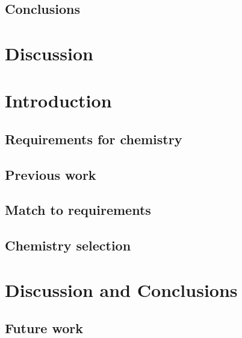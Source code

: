 \documentclass[]{report}
\begin{document}
\section{Conclusions}

\chapter{Discussion}

\chapter{Introduction}
\section{Requirements for chemistry}
\section{Previous work}
\section{Match to requirements}
\section{Chemistry selection}

\chapter{Discussion and Conclusions}
\section{Future work}
\end{document}

